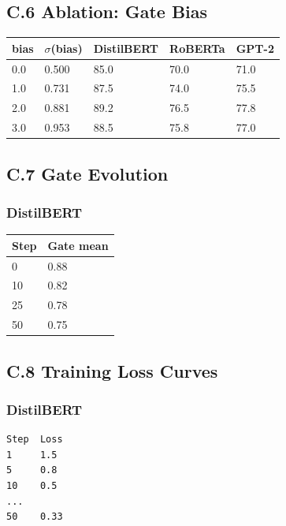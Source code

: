 \subsection{C.6 Ablation: Gate Bias}

\begin{table}[H]
\centering
\small
\begin{tabular}{lllll}
\toprule
\textbf{bias} & \textbf{$\sigma$(bias)} & \textbf{DistilBERT} & \textbf{RoBERTa} & \textbf{GPT-2} \\
\midrule
0.0 & 0.500 & 85.0 & 70.0 & 71.0 \\
1.0 & 0.731 & 87.5 & 74.0 & 75.5 \\
2.0 & 0.881 & 89.2 & 76.5 & 77.8 \\
3.0 & 0.953 & 88.5 & 75.8 & 77.0 \\
\bottomrule
\end{tabular}
\end{table}

\subsection{C.7 Gate Evolution}

\subsubsection{DistilBERT}

\begin{table}[H]
\centering
\small
\begin{tabular}{ll}
\toprule
\textbf{Step} & \textbf{Gate mean} \\
\midrule
0 & 0.88 \\
10 & 0.82 \\
25 & 0.78 \\
50 & 0.75 \\
\bottomrule
\end{tabular}
\end{table}

\subsection{C.8 Training Loss Curves}

\subsubsection{DistilBERT}
\begin{lstlisting}
Step  Loss
1     1.5
5     0.8
10    0.5
...
50    0.33
\end{lstlisting}


